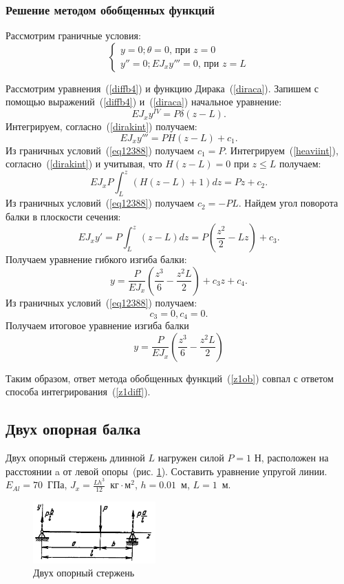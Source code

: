 \documentclass[12pt, a4paper]{article}
\begin{document}
\subsubsection{Решение методом обобщенных функций}
Рассмотрим граничные условия:
\begin{equation}
	\label{eq12388}
	\begin{cases}
	y = 0; \theta = 0\mbox{, при } z = 0\\
	y'' = 0; E J_{x} y''' = 0\mbox{, при } z = L
	\end{cases}
\end{equation}

Рассмотрим уравнения~(\ref{diffb4}) и функцию Дирака~(\ref{diraca}). Запишем с помощью выражений~(\ref{diffb4}) и~(\ref{diraca}) начальное уравнение:
\[
	E J_{x} y^{IV} = P \delta (z - L).
\]
Интегрируем, согласно~(\ref{dirakint}) получаем: 
\[
	E J_{x} y''' = P H (z - L) + c_1.
\]
Из граничных условий~(\ref{eq12388}) получаем $c_1 = P$.
Интегрируем~(\ref{heaviint}), согласно~(\ref{dirakint}) и учитывая, что $H(z - L) = 0$ при $z \leqslant L$ получаем:
\[
	E J_{x}P \int_L^z  (H (z - L) + 1) dz = Pz + c_2.
\]
Из граничных условий~(\ref{eq12388}) получаем $c_2 = -P L$.
Найдем угол поворота балки в плоскости сечения:
\[
	E J_{x} y' = P \int_L^z (z - L) dz = P \left(\frac{z^2}{2} - L z\right) + c_3.
\]
Получаем уравнение гибкого изгиба балки:
\[
	y = \frac{P}{E J_{x}} \left(\frac{z^3}{6} - \frac{z^2 L}{2}\right) + c_3 z + c_4.
\]
Из граничных условий~(\ref{eq12388}) получаем:
\[
	\label{z312233}
	c_3 = 0, c_4 = 0.
\]
Получаем итоговое уравнение изгиба балки
 \begin{equation}
	\label{z1ob}
	y = \frac{P}{E J_{x}} \left(\frac{z^3}{6} - \frac{z^2  L}{2}\right)
\end{equation}

Таким образом, ответ метода обобщенных функций~(\ref{z1ob}) совпал с ответом способа интегрирования~(\ref{z1diff}).
\subsection{Двух опорная балка}
Двух опорный стержень длинной $L$ нагружен силой $P = 1$ Н, расположен на расстоянии a от левой опоры~(рис. \ref{pic8}). Составить уравнение упругой линии. 
\newline 
$E_{Al} = 70$~ГПа, $J_{x} = \frac{L h^3}{12}$~$\mbox{кг} \cdot \mbox{м}^2$, $h = 0.01$~м, $L = 1$~м.

\begin{figure}[!h]
	\centering
	\includegraphics[width=0.42\textwidth]{pic.8}%
	\caption{Двух опорный стержень}
	\vspace*{-2mm}
	\label{pic8}
\end{figure}
\end{document}
